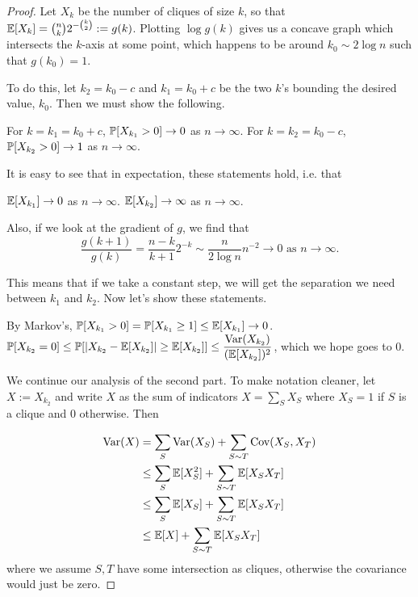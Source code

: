 \documentclass[11 pt]{scrartcl}
\begin{document}
\begin{proof}
    Let $X_k$ be the number of cliques of size $k$, so that $\mathbb E[X_k] = \binom{n}{k} 2^{-\binom{k}{2}} := g(k)$. Plotting $\log g(k)$ gives us a concave graph which intersects the $k$-axis at some point, which happens to be around $k_0 \sim 2\log n$ such that $g(k_0) = 1$. 

    To do this, let $k_2 = k_0 - c$ and $k_1 = k_0 + c$ be the two $k$'s bounding the desired value, $k_0$. Then we must show the following. 
    \begin{enumerate}[(i)]
        \ii For $k = k_1 = k_0 + c$, $\mathbb P[X_{k_1} > 0] \to 0$ as $n\to\infty$. 
        \ii For $k = k_2 = k_0 - c$, $\mathbb P[X_{k_2} > 0] \to 1$ as $n\to\infty$.  
    \end{enumerate}

    It is easy to see that in expectation, these statements hold, i.e. that 
    \begin{enumerate}[(i)]
        \ii $\mathbb E[X_{k_1}] \to 0$ as $n\to\infty$. 
        \ii $\mathbb E[X_{k_2}] \to \infty$ as $n\to\infty$.  
    \end{enumerate}

    Also, if we look at the gradient of $g$, we find that 
    \[ \dfrac{g(k+1)}{g(k)} = \dfrac{n-k}{k+1}2^{-k} \sim \dfrac{n}{2\log n}n^{-2} \to 0 \text{ as } n\to\infty.\] 

    This means that if we take a constant step, we will get the separation we need between $k_1$ and $k_2$. Now let's show these statements.  

    \begin{enumerate}[(i)]
        \ii By Markov's, $\mathbb P[X_{k_1}>0] = \mathbb P[X_{k_1} \geq 1] \leq \mathbb E[X_{k_1}] \to 0$.
        \ii $\mathbb P[X_{k_2} = 0] \leq \mathbb P[|X_{k_2} - \mathbb E[X_{k_2}]|\geq \mathbb E[X_{k_2}]] \leq \dfrac{\text{Var}(X_{k_2})}{(\mathbb E[X_{k_2}])^2}$, which we hope goes to 0. 
    \end{enumerate}
    
    We continue our analysis of the second part. To make notation cleaner, let $X := X_{k_2}$ and write $X$ as the sum of indicators $X = \sum_S X_S$ where $X_S = 1$ if $S$ is a clique and 0 otherwise. Then

    \begin{align*}
        \text{Var}(X) &= \sum_S \text{Var}(X_S) + \sum_{S \sim T} \text{Cov}(X_S, X_T) \\ 
                &\leq \sum_S \mathbb E[X_S^2] + \sum_{S \sim T} \mathbb E[X_S X_T] \\ 
                &\leq \sum_S \mathbb E[X_S] + \sum_{S \sim T} \mathbb E[X_S X_T] \\ 
                &\leq \mathbb E[X] + \sum_{S \sim T} \mathbb E[X_S X_T] 
    \end{align*}
    where we assume $S,T$ have some intersection as cliques, otherwise the covariance would just be zero. 


\end{proof}
\end{document}
